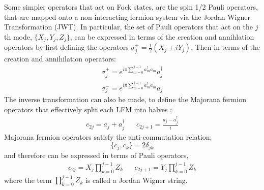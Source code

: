 Some simpler operators that act on Fock states, are the spin 1/2 Pauli operators, that are mapped onto a
non-interacting fermion system via the Jordan Wigner Transformation (JWT).
In particular, the set of Pauli operators that act on the $j$th mode,
$\{X_j, Y_j, Z_j\}$, can be expressed in terms of the creation and annihlation operators by first defining
the operators $\sigma^{\pm}_j = \frac{1}{2}(X_j \pm iY_j)$. Then in terms of the creation and annihilation
operators:
\begin{align}
    \sigma^{+}_j = e^{i\pi\sum^{j-1}_{m = 0} a^{\dagger}_m a_m} a_j^{\dagger} \\
    \sigma^{-}_j = e^{i\pi\sum^{j-1}_{m = 0} a^{\dagger}_m a_m} a_j
\end{align}
The inverse transformation can also be made, to define the Majorana
fermion operators that effectively split each LFM into halves \cite{Bravyi2000};
\begin{align}
    c_{2j} = a_j + a_j^{\dagger} &  & c_{2j+1} = \frac{a_j - a_j^{\dagger}}{i}
\end{align}
Majorana fermion operators satisfy the anti-commutation relation;
\begin{equation}
    \{c_j, c_k\} = 2\delta_{jk}
\end{equation}
and therefore can be expressed in terms of Pauli operators,
\begin{align}
    c_{2j} = X_j \prod^{j-1}_{k=0} Z_k &  & c_{2j + 1} = Y_j \prod^{j-1}_{k=0} Z_k
\end{align}
where the term $\prod^{j-1}_{k=0} Z_k$ is called a Jordan Wigner string.













